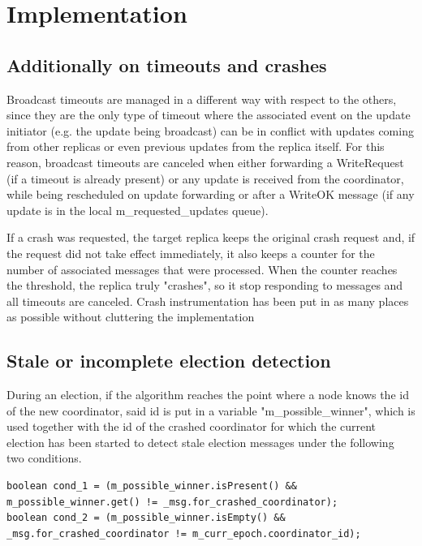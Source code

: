 \section{Implementation}

\subsection{Additionally on timeouts and crashes}

Broadcast timeouts are managed in a different way with respect to the others, since they are the only type of timeout where the associated event on the update initiator (e.g. the update being broadcast) can be in conflict with updates coming from other replicas or even previous updates from the replica itself. For this reason, broadcast timeouts are canceled when either forwarding a WriteRequest (if a timeout is already present) or any update is received from the coordinator, while being rescheduled on update forwarding or after a WriteOK message (if any update is in the local m\_requested\_updates queue).

If a crash was requested, the target replica keeps the original crash request and, if the request did not take effect immediately, it also keeps a counter for the number of associated messages that were processed. When the counter reaches the threshold, the replica truly "crashes", so it stop responding to messages and all timeouts are canceled. Crash instrumentation has been put in as many places as possible without cluttering the implementation

\subsection{Stale or incomplete election detection}

During an election, if the algorithm reaches the point where a node knows the id of the new coordinator, said id is put in a variable "m\_possible\_winner", which is used together with the id of the crashed coordinator for which the current election has been started to detect stale election messages under the following two conditions. 

\begin{lstlisting}
boolean cond_1 = (m_possible_winner.isPresent() &&
m_possible_winner.get() != _msg.for_crashed_coordinator);
boolean cond_2 = (m_possible_winner.isEmpty() &&
_msg.for_crashed_coordinator != m_curr_epoch.coordinator_id);
\end{lstlisting}

